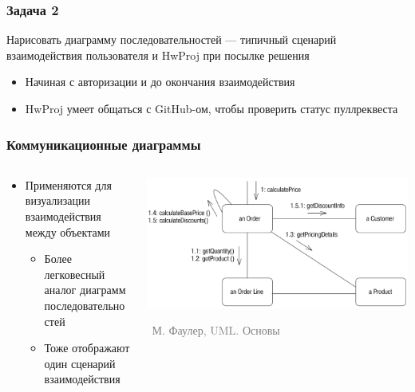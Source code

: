 \documentclass[xetex,mathserif,serif]{beamer}
\newcommand{\attribution}[1] {
	\vspace{-5mm}\begin{flushright}\begin{scriptsize}\textcolor{gray}{\textcopyright\, #1}\end{scriptsize}\end{flushright}
}
\begin{document}
	\begin{frame}
		\frametitle{Задача 2}
		Нарисовать диаграмму последовательностей --- типичный сценарий взаимодействия пользователя и HwProj при посылке решения
		\begin{itemize}
			\item Начиная с авторизации и до окончания взаимодействия
			\item HwProj умеет общаться с GitHub-ом, чтобы проверить статус пуллреквеста
		\end{itemize}
	\end{frame}

	\begin{frame}
		\frametitle{Коммуникационные диаграммы}
		\begin{columns}
			\begin{column}{0.5\textwidth}
				\begin{itemize}
					\item Применяются для визуализации взаимодействия между объектами
					\begin{itemize}
						\item Более легковесный аналог диаграмм последовательностей
						\item Тоже отображают один сценарий взаимодействия
					\end{itemize}
				\end{itemize}
			\end{column}
			\begin{column}{0.5\textwidth}
				\begin{center}
					\includegraphics[width=\textwidth]{communicationDiagram.png}
					\attribution{М. Фаулер, UML. Основы}
				\end{center}
			\end{column}
		\end{columns}
	\end{frame}
\end{document}
